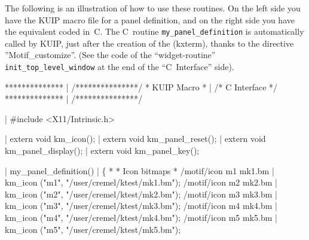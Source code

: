 The following is an illustration of how to use these routines. On
the left side you have the KUIP macro file for a panel definition, and
on the right side you have the equivalent coded in~C. The C~routine
\texttt{my_panel_definition} is automatically called by KUIP,
just after the creation of the \EW{} (kxterm), thanks
to the \CDF{} directive ''Motif\_customize''.
(See the code of the ``widget-routine'' \texttt{init_top_level_window} at the end
of the ``C~Interface'' side).
\vfill 
\begin{XMP}
**************           |     /***************/
* KUIP Macro *           |     /* C Interface */
**************           |     /***************/
 
                         |     #include <X11/Intrinsic.h>

                         |     extern void km_icon();
                         |     extern void km_panel_reset();
                         |     extern void km_panel_display();
                         |     extern void km_panel_key();

                         |     my_panel_definition()
                         |     \{
*
* Icon bitmaps
*
/motif/icon m1 mk1.bm    |       km_icon ("m1", "/user/cremel/ktest/mk1.bm");
/motif/icon m2 mk2.bm    |       km_icon ("m2", "/user/cremel/ktest/mk2.bm");
/motif/icon m3 mk3.bm    |       km_icon ("m3", "/user/cremel/ktest/mk3.bm");
/motif/icon m4 mk4.bm    |       km_icon ("m4", "/user/cremel/ktest/mk4.bm");
/motif/icon m5 mk5.bm    |       km_icon ("m5", "/user/cremel/ktest/mk5.bm");
 

\end{XMP}
